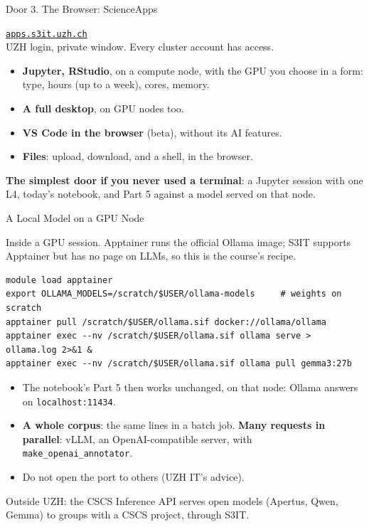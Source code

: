 \begin{frame}{Door 3. The Browser: ScienceApps}

\small
\centering
{\large \href{https://apps.s3it.uzh.ch}{\texttt{apps.s3it.uzh.ch}}}\\[0.1cm]
{\footnotesize UZH login, private window. Every cluster account has access.}

\vspace{0.3cm}
\raggedright
\begin{itemize}
    \setlength{\itemsep}{4pt}
    \item \textbf{Jupyter, RStudio}, on a compute node, with the GPU you choose in a form: type, hours (up to a week), cores, memory.
    \item \textbf{A full desktop}, on GPU nodes too.
    \item \textbf{VS Code in the browser} (beta), without its AI features.
    \item \textbf{Files}: upload, download, and a shell, in the browser.
\end{itemize}

\vspace{0.3cm}

\textbf{The simplest door if you never used a terminal}: a Jupyter session with one L4, today's notebook, and Part 5 against a model served on that node.

\end{frame}

\begin{frame}[fragile]{A Local Model on a GPU Node}

\small
Inside a GPU session. Apptainer runs the official Ollama image; S3IT supports Apptainer but has no page on LLMs, so this is the course's recipe.

{\scriptsize
\begin{verbatim}
module load apptainer
export OLLAMA_MODELS=/scratch/$USER/ollama-models     # weights on scratch
apptainer pull /scratch/$USER/ollama.sif docker://ollama/ollama
apptainer exec --nv /scratch/$USER/ollama.sif ollama serve > ollama.log 2>&1 &
apptainer exec --nv /scratch/$USER/ollama.sif ollama pull gemma3:27b
\end{verbatim}}

\vspace{0.1cm}

\begin{itemize}
    \setlength{\itemsep}{3pt}
    \item The notebook's Part 5 then works unchanged, on that node: Ollama answers on \texttt{localhost:11434}.
    \item \textbf{A whole corpus}: the same lines in a batch job. \textbf{Many requests in parallel}: vLLM, an OpenAI-compatible server, with \texttt{make\_openai\_annotator}.
    \item Do not open the port to others (UZH IT's advice).
\end{itemize}

\vspace{0.15cm}
{\footnotesize Outside UZH: the CSCS Inference API serves open models (Apertus, Qwen, Gemma) to groups with a CSCS project, through S3IT.}

\end{frame}
